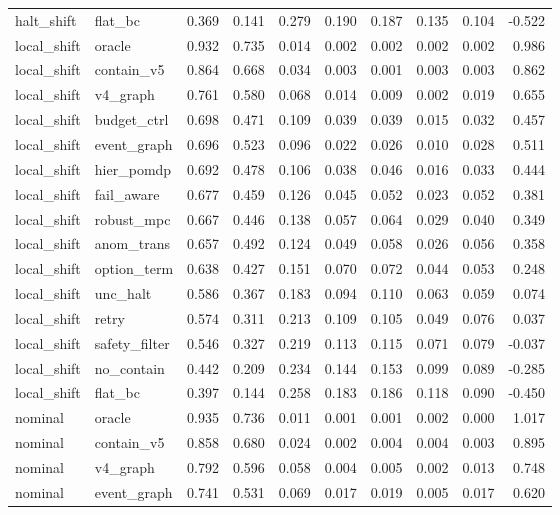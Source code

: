 \documentclass{article}
\begin{document}
\begin{longtable}{@{}llrrrrrrrr@{}}
halt\_shift & flat\_bc & 0.369 & 0.141 & 0.279 & 0.190 & 0.187 & 0.135 & 0.104 & -0.522 \\
local\_shift & oracle & 0.932 & 0.735 & 0.014 & 0.002 & 0.002 & 0.002 & 0.002 & 0.986 \\
local\_shift & contain\_v5 & 0.864 & 0.668 & 0.034 & 0.003 & 0.001 & 0.003 & 0.003 & 0.862 \\
local\_shift & v4\_graph & 0.761 & 0.580 & 0.068 & 0.014 & 0.009 & 0.002 & 0.019 & 0.655 \\
local\_shift & budget\_ctrl & 0.698 & 0.471 & 0.109 & 0.039 & 0.039 & 0.015 & 0.032 & 0.457 \\
local\_shift & event\_graph & 0.696 & 0.523 & 0.096 & 0.022 & 0.026 & 0.010 & 0.028 & 0.511 \\
local\_shift & hier\_pomdp & 0.692 & 0.478 & 0.106 & 0.038 & 0.046 & 0.016 & 0.033 & 0.444 \\
local\_shift & fail\_aware & 0.677 & 0.459 & 0.126 & 0.045 & 0.052 & 0.023 & 0.052 & 0.381 \\
local\_shift & robust\_mpc & 0.667 & 0.446 & 0.138 & 0.057 & 0.064 & 0.029 & 0.040 & 0.349 \\
local\_shift & anom\_trans & 0.657 & 0.492 & 0.124 & 0.049 & 0.058 & 0.026 & 0.056 & 0.358 \\
local\_shift & option\_term & 0.638 & 0.427 & 0.151 & 0.070 & 0.072 & 0.044 & 0.053 & 0.248 \\
local\_shift & unc\_halt & 0.586 & 0.367 & 0.183 & 0.094 & 0.110 & 0.063 & 0.059 & 0.074 \\
local\_shift & retry & 0.574 & 0.311 & 0.213 & 0.109 & 0.105 & 0.049 & 0.076 & 0.037 \\
local\_shift & safety\_filter & 0.546 & 0.327 & 0.219 & 0.113 & 0.115 & 0.071 & 0.079 & -0.037 \\
local\_shift & no\_contain & 0.442 & 0.209 & 0.234 & 0.144 & 0.153 & 0.099 & 0.089 & -0.285 \\
local\_shift & flat\_bc & 0.397 & 0.144 & 0.258 & 0.183 & 0.186 & 0.118 & 0.090 & -0.450 \\
nominal & oracle & 0.935 & 0.736 & 0.011 & 0.001 & 0.001 & 0.002 & 0.000 & 1.017 \\
nominal & contain\_v5 & 0.858 & 0.680 & 0.024 & 0.002 & 0.004 & 0.004 & 0.003 & 0.895 \\
nominal & v4\_graph & 0.792 & 0.596 & 0.058 & 0.004 & 0.005 & 0.002 & 0.013 & 0.748 \\
nominal & event\_graph & 0.741 & 0.531 & 0.069 & 0.017 & 0.019 & 0.005 & 0.017 & 0.620 \\

\end{longtable}
\end{document}
